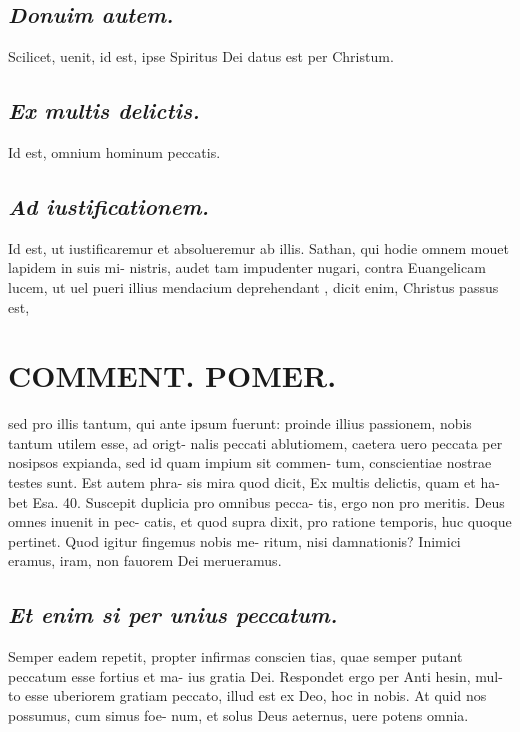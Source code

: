 \documentclass{article}
\begin{document}
\begin{pages}
\subsection*{\textit{Donuim autem.  }}\pstart Scilicet, uenit, id est, ipse Spiritus Dei datus est per Christum.   \pend
{}
{}
\subsection*{\textit{Ex multis delictis. }}\pstart Id est, omnium hominum peccatis.  \pend
{}
{}
\subsection*{\textit{Ad iustificationem. }}\pstart Id est, ut iustificaremur et absolueremur ab illis.  Sathan, qui hodie omnem mouet lapidem in suis mi- nistris, audet tam impudenter nugari, contra Euangelicam lucem, ut uel pueri illius mendacium deprehendant , dicit enim, Christus passus est,  \pend
\section*{COMMENT. POMER.  }\pstart sed pro illis tantum, qui ante ipsum fuerunt: proinde illius passionem, nobis tantum utilem esse, ad origt- nalis peccati ablutiomem, caetera uero peccata per nosipsos expianda, sed id quam impium sit commen- tum, conscientiae nostrae testes sunt. Est autem phra- sis mira quod dicit, Ex multis delictis, quam et ha- bet Esa. 40. Suscepit duplicia pro omnibus pecca- tis, ergo non pro meritis. Deus omnes inuenit in pec- catis, et quod supra dixit, pro ratione temporis, huc quoque pertinet. Quod igitur fingemus nobis me- ritum, nisi damnationis? Inimici eramus, iram, non fauorem Dei merueramus.   \pend
{}
{}
\subsection*{\textit{Et enim si per unius peccatum. }}\pstart Semper eadem repetit, propter infirmas conscien tias, quae semper putant peccatum esse fortius et ma- ius gratia Dei. Respondet ergo per Anti hesin, mul- to esse uberiorem gratiam peccato, illud est ex Deo, hoc in nobis. At quid nos possumus, cum simus foe- num, et solus Deus aeternus, uere potens omnia.   \pend
{}
{}

\end{pages}
\end{document}
